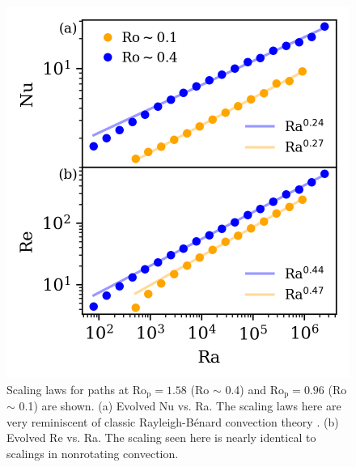 \documentclass[twocolumn, amsmath, amsfonts, amssymb]{aastex62}
\newcommand{\RB}{Rayleigh-B\'{e}nard }
\newcommand{\pro}{\ensuremath{\text{Ro}_{\text{p}}}}
\begin{document}
\begin{figure}[t!]
    \includegraphics{./figs/nu_and_re.png}
    \caption{Scaling laws for paths at $\pro = 1.58$ (Ro $\sim$ 0.4) and
    $\pro = 0.96$ (Ro $\sim$ 0.1) are shown. 
    (a) Evolved Nu vs. Ra. The scaling laws here are very reminiscent of classic \RB convection
    theory \citep{ahlers&all2009}.
    (b) Evolved Re vs. Ra.
    The scaling seen here is nearly identical to scalings in nonrotating convection.
    \label{fig:nu_and_re} }
\end{figure}
\end{document}
